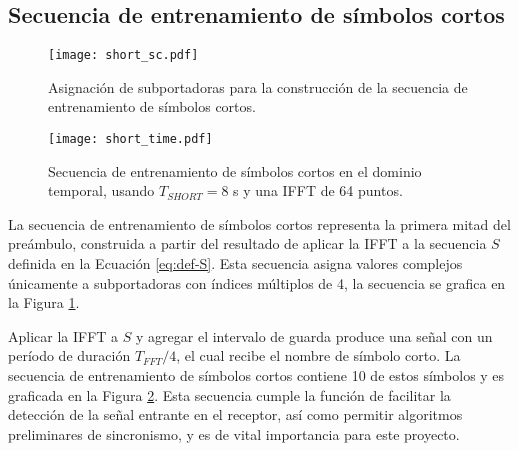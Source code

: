 \subsection{Secuencia de entrenamiento de símbolos cortos}
\label{Ss:ch2-short}

\begin{figure}[t]
    \centering{}\texttt{[image: short\_sc.pdf]}
    \caption{Asignación de subportadoras para la construcción de la secuencia de entrenamiento de símbolos cortos.\label{fig:short-sc}}  
\end{figure}
\begin{figure}[t]
    \centering{}\texttt{[image: short\_time.pdf]}
    \caption[Secuencia de entrenamiento de símbolos cortos en el dominio temporal.]{Secuencia de entrenamiento de símbolos cortos en el dominio temporal, usando $T_{SHORT} = 8$ \textmu s y una IFFT de 64 puntos.\label{fig:short-time}}  
\end{figure}

La secuencia de entrenamiento de símbolos cortos representa la primera mitad del preámbulo, construida a partir del resultado de aplicar la IFFT a la secuencia $S$ definida en la Ecuación \ref{eq:def-S}. Esta secuencia asigna valores complejos únicamente a subportadoras con índices múltiplos de 4, la secuencia se grafica en la Figura \ref{fig:short-sc}.

Aplicar la IFFT a $S$ y agregar el intervalo de guarda produce una señal con un período de duración $T_{FFT}/4$, el cual recibe el nombre de símbolo corto. La secuencia de entrenamiento de símbolos cortos contiene 10 de estos símbolos y es graficada en la Figura \ref{fig:short-time}. Esta secuencia cumple la función de facilitar la detección de la señal entrante en el receptor, así como permitir algoritmos preliminares de sincronismo, y es de vital importancia para este proyecto.

